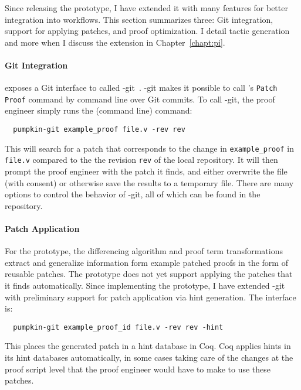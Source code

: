 Since releasing the \sysname prototype, I have extended it with many features
for better integration into  workflows.
This section summarizes three: Git integration, support for applying patches,
and proof optimization.
I detail tactic generation and more when I discuss the \toolnamec extension
in Chapter~\ref{chapt:pi}.

\paragraph{Git Integration} \sysnamelong exposes a Git interface to \sysname
called \sysname-git~\cite{pumpkin-git}.
\sysname-git makes it possible to call \sysname's \lstinline{Patch Proof} command by command line over Git commits.
To call \sysname-git, the proof engineer simply runs the (command line) command:

\begin{lstlisting}
  pumpkin-git example_proof file.v -rev rev
\end{lstlisting}
This will search for a patch that corresponds to the change in \lstinline{example_proof} in \lstinline{file.v} compared to the the revision \lstinline{rev}
of the local repository. It will then prompt the proof engineer with the patch it finds, and either overwrite the file (with consent) 
or otherwise save the results to a temporary file. There are many options to control the behavior of \sysname-git,
all of which can be found in the repository.

\paragraph{Patch Application}
For the \sysname prototype, the differencing algorithm and proof term transformations extract and generalize information form example patched proofs
in the form of reusable patches. The prototype does not yet support applying the patches that it finds automatically.
Since implementing the prototype, I have extended \sysname-git with preliminary support for patch application via hint generation.
The interface is: %

\begin{lstlisting}
  pumpkin-git example_proof_id file.v -rev rev -hint
\end{lstlisting}
This places the generated patch in a hint database in Coq.
Coq applies hints in its hint databases automatically, in some cases taking care of the changes at the proof script level
that the proof engineer would have to make to use these patches.

